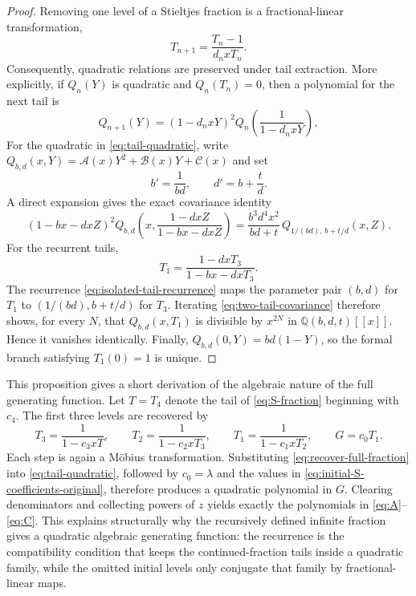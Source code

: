 \documentclass[11pt]{article}
\theoremstyle{remark}
\begin{document}
\begin{proof}
Removing one level of a Stieltjes fraction is a fractional-linear
transformation,
\begin{equation}
 T_{n+1}=\frac{T_n-1}{d_nxT_n}.
 \label{eq:tail-extraction}
\end{equation}
Consequently, quadratic relations are preserved under tail extraction. More
explicitly, if $Q_n(Y)$ is quadratic and $Q_n(T_n)=0$, then a polynomial for
the next tail is
\begin{equation}
 Q_{n+1}(Y)=(1-d_nxY)^2
 Q_n\!\left(\frac1{1-d_nxY}\right),
 \label{eq:quadratic-transport}
\end{equation}
For the quadratic in \eqref{eq:tail-quadratic}, write
$Q_{b,d}(x,Y)=\mathcal A(x)Y^2+\mathcal B(x)Y+\mathcal C(x)$ and set
\[
 b'=\frac1{bd},\qquad d'=b+\frac{t}{d}.
\]
A direct expansion gives the exact covariance identity
\begin{equation}
 (1-bx-dxZ)^2Q_{b,d}\!\left(x,\frac{1-dxZ}{1-bx-dxZ}\right)
 =\frac{b^3d^4x^2}{bd+t}\,Q_{1/(bd),\,b+t/d}(x,Z).
 \label{eq:two-tail-covariance}
\end{equation}
For the recurrent tails,
\[
 T_1=\frac{1-dxT_3}{1-bx-dxT_3}.
\]
The recurrence \eqref{eq:isolated-tail-recurrence} maps the parameter pair
$(b,d)$ for $T_1$ to $(1/(bd),b+t/d)$ for $T_3$.  Iterating
\eqref{eq:two-tail-covariance} therefore shows, for every $N$, that
$Q_{b,d}(x,T_1)$ is divisible by $x^{2N}$ in
$\mathbb Q(b,d,t)[[x]]$.  Hence it vanishes identically.  Finally,
$Q_{b,d}(0,Y)=bd(1-Y)$, so the formal branch satisfying $T_1(0)=1$ is unique.
\end{proof}
This proposition gives a short derivation of the algebraic nature of the full
generating function. Let $T=T_4$ denote the tail of \eqref{eq:S-fraction}
beginning with $c_4$. The first three levels are recovered by
\begin{equation}
 T_3=\frac1{1-c_3xT},\qquad
 T_2=\frac1{1-c_2xT_3},\qquad
 T_1=\frac1{1-c_1xT_2},\qquad G=c_0T_1.
 \label{eq:recover-full-fraction}
\end{equation}
Each step is again a M\"obius transformation. Substituting
\eqref{eq:recover-full-fraction} into \eqref{eq:tail-quadratic}, followed by
$c_0=\lambda$ and the values in
\eqref{eq:initial-S-coefficients-original}, therefore produces a quadratic
polynomial in $G$. Clearing denominators and collecting powers of $z$ yields
exactly the polynomials in \eqref{eq:A}--\eqref{eq:C}. This explains
structurally why the recursively defined infinite fraction gives a quadratic
algebraic generating function: the recurrence is the compatibility condition
that keeps the continued-fraction tails inside a quadratic family, while the
omitted initial levels only conjugate that family by fractional-linear maps.
\end{document}
